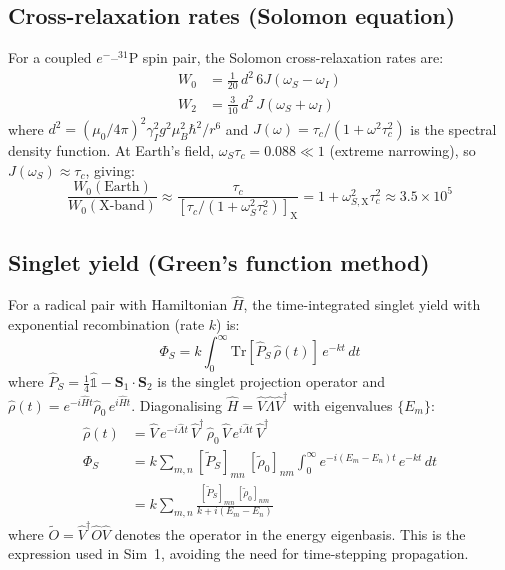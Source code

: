 \subsection{Cross-relaxation rates (Solomon equation)}

For a coupled $e^-$--$^{31}$P spin pair, the Solomon cross-relaxation rates are\cite{Solomon1955}:
\begin{align}
W_0 &= \frac{1}{20}\,d^2\,6J(\omega_S - \omega_I) \label{eq:W0}\\
W_2 &= \frac{3}{10}\,d^2\,J(\omega_S + \omega_I) \label{eq:W2}
\end{align}
where $d^2 = (\mu_0/4\pi)^2 \gamma_I^2 g^2 \mu_B^2 \hbar^2 / r^6$ and $J(\omega) = \tau_c/(1 + \omega^2\tau_c^2)$ is the spectral density function. At Earth's field, $\omega_S\tau_c = 0.088 \ll 1$ (extreme narrowing), so $J(\omega_S) \approx \tau_c$, giving:
\begin{equation}
\frac{W_0(\mathrm{Earth})}{W_0(\mathrm{X\text{-}band})} \approx \frac{\tau_c}{[\tau_c/(1 + \omega_S^2\tau_c^2)]_\mathrm{X}} = 1 + \omega_{S,\mathrm{X}}^2\tau_c^2 \approx 3.5 \times 10^5
\end{equation}

\subsection{Singlet yield (Green's function method)}

For a radical pair with Hamiltonian $\hat{H}$, the time-integrated singlet yield with exponential recombination (rate $k$) is\cite{Haberkorn1976}:
\begin{equation}
\Phi_S = k\int_0^\infty \mathrm{Tr}[\hat{P}_S\,\hat{\rho}(t)]\,e^{-kt}\,dt
\end{equation}
where $\hat{P}_S = \frac{1}{4}\hat{\mathbb{1}} - \mathbf{S}_1 \cdot \mathbf{S}_2$ is the singlet projection operator and $\hat{\rho}(t) = e^{-i\hat{H}t}\hat{\rho}_0\,e^{i\hat{H}t}$. Diagonalising $\hat{H} = \hat{V}\hat{\Lambda}\hat{V}^\dagger$ with eigenvalues $\{E_m\}$:
\begin{align}
\hat{\rho}(t) &= \hat{V}\,e^{-i\hat{\Lambda}t}\,\hat{V}^\dagger\,\hat{\rho}_0\,\hat{V}\,e^{i\hat{\Lambda}t}\,\hat{V}^\dagger \\
\Phi_S &= k\sum_{m,n} [\tilde{P}_S]_{mn}\,[\tilde{\rho}_0]_{nm} \int_0^\infty e^{-i(E_m-E_n)t}\,e^{-kt}\,dt \\
&= k\sum_{m,n} \frac{[\tilde{P}_S]_{mn}\,[\tilde{\rho}_0]_{nm}}{k + i(E_m - E_n)} \label{eq:PhiS}
\end{align}
where $\tilde{O} = \hat{V}^\dagger\hat{O}\hat{V}$ denotes the operator in the energy eigenbasis. This is the expression used in Sim~1, avoiding the need for time-stepping propagation.


